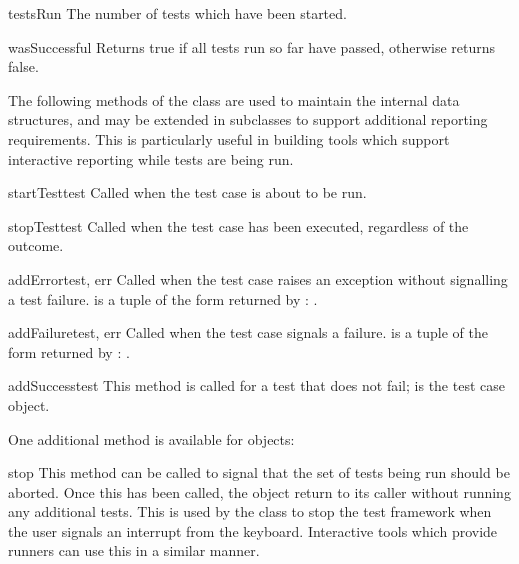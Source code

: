 \begin{memberdesc}[TestResult]{testsRun}
  The number of tests which have been started.
\end{memberdesc}

\begin{methoddesc}[TestResult]{wasSuccessful}{}
  Returns true if all tests run so far have passed, otherwise returns
  false.
\end{methoddesc}


The following methods of the  class are used to
maintain the internal data structures, and may be extended in
subclasses to support additional reporting requirements.  This is
particularly useful in building tools which support interactive
reporting while tests are being run.

\begin{methoddesc}[TestResult]{startTest}{test}
  Called when the test case  is about to be run.
\end{methoddesc}

\begin{methoddesc}[TestResult]{stopTest}{test}
  Called when the test case  has been executed, regardless
  of the outcome.
\end{methoddesc}

\begin{methoddesc}[TestResult]{addError}{test, err}
  Called when the test case  raises an exception without
  signalling a test failure.   is a tuple of the form
  returned by :  .
\end{methoddesc}

\begin{methoddesc}[TestResult]{addFailure}{test, err}
  Called when the test case  signals a failure.
   is a tuple of the form returned by
  :  .
\end{methoddesc}

\begin{methoddesc}[TestResult]{addSuccess}{test}
  This method is called for a test that does not fail;  is
  the test case object.
\end{methoddesc}


One additional method is available for  objects:

\begin{methoddesc}[TestResult]{stop}{}
  This method can be called to signal that the set of tests being run
  should be aborted.  Once this has been called, the
   object return to its caller without running any
  additional tests.  This is used by the  class
  to stop the test framework when the user signals an interrupt from
  the keyboard.  Interactive tools which provide runners can use this
  in a similar manner.
\end{methoddesc}


